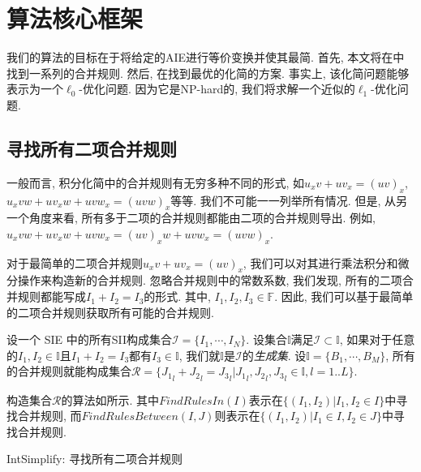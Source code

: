 \section{算法核心框架} \label{Simplify-03}
我们的算法的目标在于将给定的AIE进行等价变换并使其最简. 首先, 本文将在中找到一系列的合并规则. 然后, 在找到最优的化简的方案. 事实上, 该化简问题能够表示为一个$\ell_0$-优化问题. 因为它是NP-hard的, 我们将求解一个近似的$\ell_1$-优化问题. 


\subsection{寻找所有二项合并规则}\label{all_rules-03}
一般而言, 积分化简中的合并规则有无穷多种不同的形式, 如$u_x v + u v_x = (uv)_x$, $u_x v w+u v_x w + u v w_x = (uvw)_x$等等. 我们不可能一一列举所有情况. 但是, 从另一个角度来看, 所有多于二项的合并规则都能由二项的合并规则导出. 例如, $u_xvw+uv_xw+uvw_x=(uv)_xw+uvw_x=(uvw)_x$. 

对于最简单的二项合并规则$u_x v + u v_x = (uv)_x$, 我们可以对其进行乘法\D 积分和微分操作来构造新的合并规则. 忽略合并规则中的常数系数, 我们发现, 所有的二项合并规则都能写成$I_1+I_2=I_3$的形式. 其中, $I_1,I_2,I_3\in \mathbb F$. 因此, 我们可以基于最简单的二项合并规则获取所有可能的合并规则. 

设一个 SIE 中的所有SII构成集合$\mathcal I =\{I_1,\cdots,I_N\}$. 设集合$\mathbb I$满足$\mathcal I \subset \mathbb I$, 如果对于任意的$I_1,I_2\in \mathbb I$且$I_1+I_2=I_3$都有$I_3\in \mathbb I$, 我们就$\mathbb I$是$\mathcal I$的\emph{生成集}. 设$\mathbb I=\{B_1,\cdots,B_M\}$, 所有的合并规则就能构成集合$\mathcal R=\{{J_1}_l+{J_2}_l={J_3}_l|{J_1}_l,{J_2}_l,{J_3}_l \in \mathbb I, l=1..L\}$.

构造集合$\mathcal R$的算法如所示. 其中$FindRulesIn(I)$表示在$\{(I_1,I_2)|I_1, I_2 \in I\}$中寻找合并规则, 而$FindRulesBetween(I,J)$则表示在$\{(I_1,I_2)|I_1\in I, I_2 \in J\}$中寻找合并规则. 

\begin{algorithm}
\caption{IntSimplify: 寻找所有二项合并规则}
\label{FindAllRules}
\end{algorithm}

